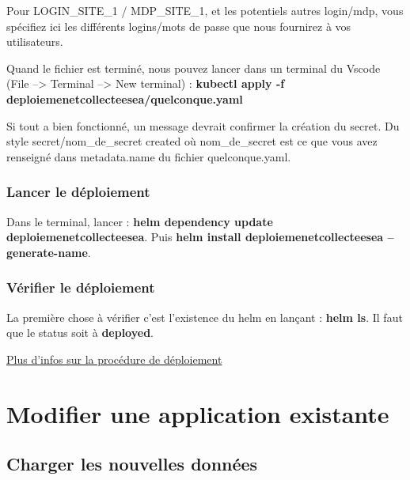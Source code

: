 \documentclass[
  letterpaper,
  DIV=11,
  numbers=noendperiod]{scrreprt}
\begin{document}
Pour LOGIN\_SITE\_1 / MDP\_SITE\_1, et les potentiels autres login/mdp,
vous spécifiez ici les différents logins/mots de passe que nous
fournirez à vos utilisateurs.

Quand le fichier est terminé, nous pouvez lancer dans un terminal du
Vscode (File --\textgreater{} Terminal --\textgreater{} New terminal) :
\textbf{kubectl apply -f deploiemenetcollecteesea/quelconque.yaml}

Si tout a bien fonctionné, un message devrait confirmer la création du
secret. Du style secret/nom\_de\_secret created où nom\_de\_secret est
ce que vous avez renseigné dans metadata.name du fichier
quelconque.yaml.

\hypertarget{lancer-le-duxe9ploiement}{%
\subsection{Lancer le déploiement}\label{lancer-le-duxe9ploiement}}

Dans le terminal, lancer : \textbf{helm dependency update
deploiemenetcollecteesea}. Puis \textbf{helm install
deploiemenetcollecteesea --generate-name}.

\hypertarget{vuxe9rifier-le-duxe9ploiement}{%
\subsection{Vérifier le
déploiement}\label{vuxe9rifier-le-duxe9ploiement}}

La première chose à vérifier c'est l'existence du helm en lançant :
\textbf{helm ls}. Il faut que le status soit à \textbf{deployed}.

\href{https://github.com/InseeFrLab/sspcloud-tutorials/blob/main/deployment/shiny-app.md}{Plus
d'infos sur la procédure de déploiement}


\hypertarget{modifier-une-application-existante}{%
\chapter{Modifier une application
existante}\label{modifier-une-application-existante}}

\hypertarget{charger-les-nouvelles-donnuxe9es}{%
\section{Charger les nouvelles
données}\label{charger-les-nouvelles-donnuxe9es}}
\end{document}
